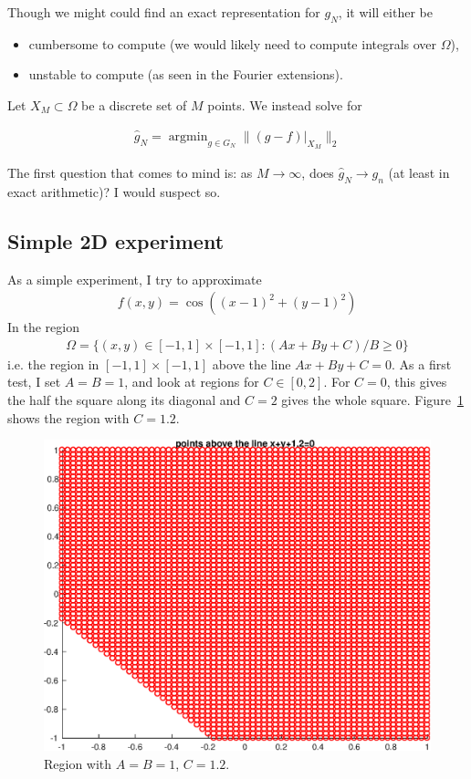 \documentclass{article}
\DeclareMathOperator*{\argmin}{argmin}
\begin{document}
Though we might could find an exact representation for $g_N$, it will either be
\begin{itemize}
\item cumbersome to compute (we would likely need to compute integrals over $\Omega$),
\item unstable to compute (as seen in the Fourier extensions).
\end{itemize}

Let $X_M \subset \Omega$ be a discrete set of $M$ points. We instead solve for

\begin{align}
\hat{g}_N = \argmin_{g \in G_N} \| \left . (g-f) \right |_{X_M} \|_2
\end{align}

The first question that comes to mind is: as $M \to \infty$, does $\hat{g}_N \to g_n$ (at least in exact arithmetic)? I would suspect so.

\subsection{Simple 2D experiment}

As a simple experiment, I try to approximate
\begin{align}
f(x,y) = \cos((x-1)^2+(y-1)^2)
\end{align}
In the region
\begin{align}
\Omega = \{(x,y) \in [-1,1] \times [-1,1]: (Ax+By+C)/B \geq 0 \}
\end{align}
i.e. the region in $[-1,1] \times [-1,1]$ above the line $Ax+By+C=0$. As a first test, I set $A=B=1$, and look at regions for $C \in [0,2]$. For $C=0$, this gives the half the square along its diagonal and $C=2$ gives the whole square. Figure~\ref{region_c} shows the region with $C=1.2$.
\begin{figure}[!h]
\centering
\includegraphics[scale = 0.5]{subset_plot.eps}
\caption{Region with $A=B=1$, $C=1.2$.}
\label{region_c}
\end{figure}
\end{document}
